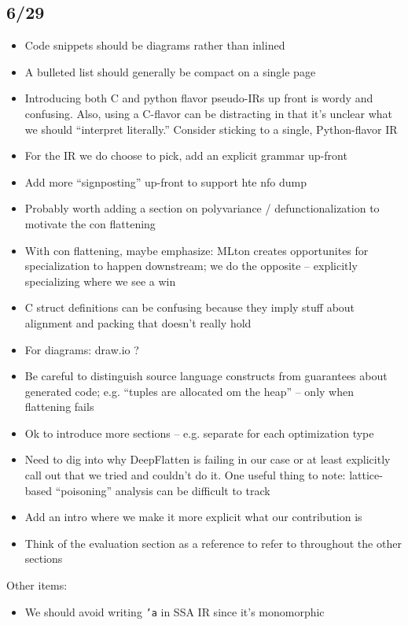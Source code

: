 \documentclass[leqno,11pt]{article}
\begin{document}
\subsection{6/29}
\begin{itemize}
\item Code snippets should be diagrams rather than inlined
\item A bulleted list should generally be compact on a single page
\item Introducing both C and python flavor pseudo-IRs up front is wordy and
  confusing. Also, using a C-flavor can be distracting in that it's unclear what
  we should ``interpret literally.'' Consider sticking to a single,
  Python-flavor IR
\item For the IR we do choose to pick, add an explicit grammar up-front
\item Add more ``signposting'' up-front to support hte nfo dump
\item Probably worth adding a section on polyvariance / defunctionalization to
  motivate the con flattening

\item With con flattening, maybe emphasize: MLton creates opportunites for
  specialization to happen downstream; we do the opposite -- explicitly
  specializing where we see a win

\item C struct definitions can be confusing because they imply stuff about
  alignment and packing that doesn't really hold

\item For diagrams: draw.io ?

\item Be careful to distinguish source language constructs from guarantees about
  generated code; e.g. ``tuples are allocated om the heap'' -- only when
  flattening fails

\item Ok to introduce more sections -- e.g. separate for each optimization type

\item Need to dig into why DeepFlatten is failing in our case or at least
  explicitly call out that we tried and couldn't do it. One useful thing to
  note: lattice-based ``poisoning'' analysis can be difficult to track

\item Add an intro where we make it more explicit what our contribution is

\item Think of the evaluation section as a reference to refer to throughout the
  other sections

\end{itemize}

Other items:
\begin{itemize}
\item We should avoid writing \texttt{'a} in SSA IR since it's monomorphic
\end{itemize}



\nocite{*}


\end{document}
